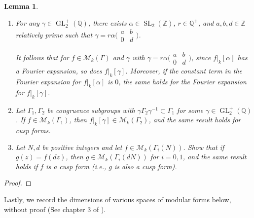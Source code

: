 \documentclass[10pt,leqno,twoside]{article}
\theoremstyle{plain}
\newtheorem{lemma}[lem]{Lemma}
\theoremstyle{definition}
\numberwithin{equation}{section}
\numberwithin{lem}{section}
\newcommand{\textib}[1]{\textbf{\textit{#1\index{#1}}}} %
\DeclareMathOperator{\GL}{GL}
\DeclareMathOperator{\SL}{SL}
\newcommand{\slz}{\SL_2(\mathbb{Z})}
\newcommand{\glqp}{\GL_2^+(\mathbb{Q})}
\newcommand{\tbd}{{\Huge\color{red}{\textib{TBD}}}}
\begin{document}
\begin{lemma}\label{lem: weight k operator properties}
    \begin{enumerate}[label = \textup{(\alph*)}]
        \item For any $\gamma\in\glqp$, there exists $\alpha\in\slz$, $r\in\mathbb Q^+$, and $a,b,d\in\mathbb Z$ relatively prime such that $\gamma = r\alpha \big(\!\begin{smallmatrix}
            a & b \\ 0 & d
        \end{smallmatrix}\!\big)$. 
    
        It follows that for $f\in\mathcal M_k(\varGamma)$ and $\gamma$ with $\gamma = r\alpha \big(\!\begin{smallmatrix}
            a & b \\ 0 & d
        \end{smallmatrix}\!\big)$, since $f|_k[\alpha]$ has a Fourier expansion, so does $f|_k[\gamma]$. Moreover, if the constant term in the Fourier expansion for $f|_k[\alpha]$ is $0$, the same holds for the Fourier expansion for $f|_k[\gamma]$.
        \item Let $\varGamma_1,\varGamma_2$ be congruence subgroups with $\gamma\varGamma_2\gamma^{-1}\subset \varGamma_1$ for some $\gamma\in\glqp$. If $f\in\mathcal M_k(\varGamma_1)$, then $f|_k[\gamma]\in\mathcal M_k(\varGamma_2)$, and the same result holds for cusp forms.
        \item Let $N,d$ be positive integers and let $f\in\mathcal M_k(\varGamma_i(N))$. Show that if $g(z) = f(dz)$, then $g\in\mathcal M_k(\varGamma_i(dN))$ for $i = 0,1$, and the same result holds if $f$ is a cusp form \textup{(}i.e., $g$ is also a cusp form\textup{)}.
    \end{enumerate}  
\end{lemma}
\begin{proof}
    \tbd
\end{proof}
Lastly, we record the dimensions of various spaces of modular forms below, without proof (See chapter 3 of \cite{diamond}).
\end{document}
